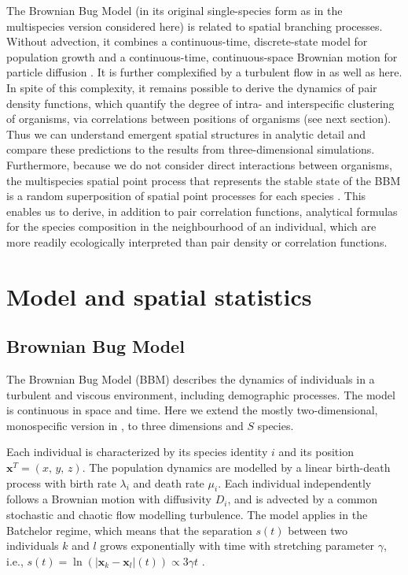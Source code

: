 \documentclass[12pt,english]{article}
\newcommand{\bx}{\boldsymbol{x}}
\begin{document}
The Brownian Bug Model (in its original single-species form as in
the multispecies version considered here) is related to spatial branching
processes. Without advection, it combines a continuous-time, discrete-state
model for population growth and a continuous-time, continuous-space
Brownian motion for particle diffusion \citep{birch_master_2006}.
It is further complexified by a turbulent flow in \citet{young_reproductive_2001,picoche_rescience_2022}
as well as here. In spite of this complexity, it remains possible
to derive the dynamics of pair density functions, which quantify the
degree of intra- and interspecific clustering of organisms, via correlations
between positions of organisms (see next section). Thus we can understand
emergent spatial structures in analytic detail and compare these predictions to the results from three-dimensional simulations. Furthermore, because we do not consider direct interactions between organisms, the multispecies spatial point process that represents the stable state of the BBM is a random superposition of spatial point processes for each species
\citep{illian2008statistical}. This enables us to derive, in addition
to pair correlation functions, analytical formulas for the species
composition in the neighbourhood of an individual, which are more
readily ecologically interpreted than pair density or correlation
functions.

\section*{Model and spatial statistics}

\subsection*{Brownian Bug Model}

The Brownian Bug Model (BBM) describes the dynamics of individuals
in a turbulent and viscous environment, including demographic processes.
The model is continuous in space and time. Here we extend the mostly
two-dimensional, monospecific version in \citet{young_reproductive_2001},
to three dimensions and $S$ species.

Each individual is characterized by its species identity $i$ and
its position $\mathbf{x}^{T}=(x,\,y,\,z)$. The population dynamics
are modelled by a linear birth-death process with birth rate $\lambda_{i}$
and death rate $\mu_{i}$. Each individual independently follows a
Brownian motion with diffusivity $D_{i}$, and is advected by a common
stochastic and chaotic flow modelling turbulence. The model applies
in the Batchelor regime, which means that the separation $s(t)$ between
two individuals $k$ and $l$ grows exponentially with time with stretching
parameter $\gamma$, i.e., $s(t)=\ln\left(|\bx_{k}-\bx_{l}|(t)\right)\propto3\gamma t$
\citep{kraichnan_convection_1974,young_reproductive_2001}.
\end{document}
